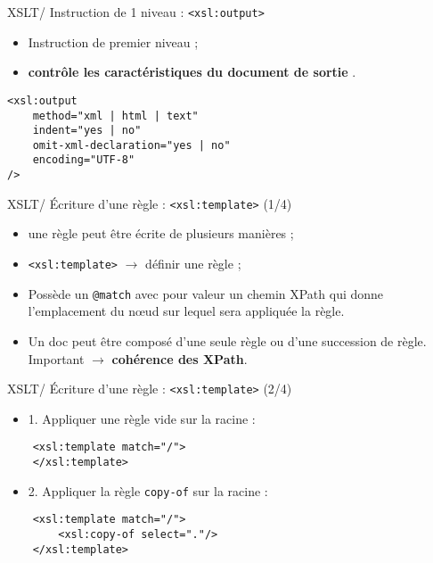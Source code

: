 \documentclass{beamer}
\begin{document}
    \begin{frame}[fragile]{XSLT/ Instruction de 1 niveau : \texttt{<xsl:output>}}
    \Large
        \begin{itemize}
            \item Instruction de premier niveau ;
            \item \og \textbf{contrôle les caractéristiques du document de sortie} \fg.
        \end{itemize}

        \begin{verbatim}
<xsl:output
    method="xml | html | text"
    indent="yes | no"
    omit-xml-declaration="yes | no"
    encoding="UTF-8"
/>
        \end{verbatim}
    \end{frame}

    \begin{frame}[fragile]{XSLT/ Écriture d'une règle : \texttt{<xsl:template>} (1/4)}
        \Large
        \begin{itemize}
            \item une règle peut être écrite de plusieurs manières ;
            \bigskip
            \item \texttt{<xsl:template>} $\rightarrow$ définir une règle ;
            \bigskip
            \item Possède un \texttt{@match} avec pour valeur un chemin XPath qui donne l'emplacement du n\oe ud sur lequel sera appliquée la règle.
            \bigskip
            \item Un doc peut être composé d'une seule règle ou d'une succession de règle. Important $\rightarrow$ \textbf{cohérence des XPath}.
        \end{itemize}
    \end{frame}

    \begin{frame}[fragile]{XSLT/ Écriture d'une règle : \texttt{<xsl:template>} (2/4)}
        \Large
        \begin{itemize}
            \item 1. Appliquer une règle vide sur la racine :
        \end{itemize}
        
        \begin{verbatim}
    <xsl:template match="/">
    </xsl:template>
        \end{verbatim}
        
        \begin{itemize}
            \item 2. Appliquer la règle \texttt{copy-of} sur la racine :
        \end{itemize}

        \begin{verbatim}
    <xsl:template match="/">
        <xsl:copy-of select="."/>
    </xsl:template>
        \end{verbatim}
    \end{frame}
\end{document}
